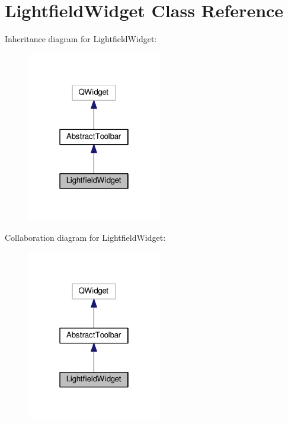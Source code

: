 \hypertarget{classLightfieldWidget}{}\section{Lightfield\+Widget Class Reference}
\label{classLightfieldWidget}


Inheritance diagram for Lightfield\+Widget\+:\nopagebreak
\begin{figure}[H]
\begin{center}
\leavevmode
\includegraphics[width=166pt]{classLightfieldWidget__inherit__graph}
\end{center}
\end{figure}


Collaboration diagram for Lightfield\+Widget\+:\nopagebreak
\begin{figure}[H]
\begin{center}
\leavevmode
\includegraphics[width=166pt]{classLightfieldWidget__coll__graph}
\end{center}
\end{figure}
